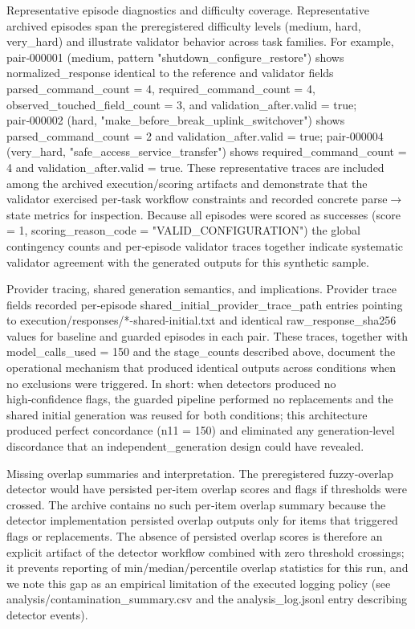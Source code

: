 \documentclass[conference]{IEEEtran}
\begin{document}
Representative episode diagnostics and difficulty coverage. Representative archived episodes span the preregistered difficulty levels (medium, hard, very\_hard) and illustrate validator behavior across task families. For example, pair‑000001 (medium, pattern "shutdown\_configure\_restore") shows normalized\_response identical to the reference and validator fields parsed\_command\_count = 4, required\_command\_count = 4, observed\_touched\_field\_count = 3, and validation\_after.valid = true; pair‑000002 (hard, "make\_before\_break\_uplink\_switchover") shows parsed\_command\_count = 2 and validation\_after.valid = true; pair‑000004 (very\_hard, "safe\_access\_service\_transfer") shows required\_command\_count = 4 and validation\_after.valid = true. These representative traces are included among the archived execution/scoring artifacts and demonstrate that the validator exercised per‑task workflow constraints and recorded concrete parse\ensuremath{\rightarrow}state metrics for inspection. Because all episodes were scored as successes (score = 1, scoring\_reason\_code = "VALID\_CONFIGURATION") the global contingency counts and per‑episode validator traces together indicate systematic validator agreement with the generated outputs for this synthetic sample.

Provider tracing, shared generation semantics, and implications. Provider trace fields recorded per‑episode shared\_initial\_provider\_trace\_path entries pointing to execution/responses/*-shared-initial.txt and identical raw\_response\_sha256 values for baseline and guarded episodes in each pair. These traces, together with model\_calls\_used = 150 and the stage\_counts described above, document the operational mechanism that produced identical outputs across conditions when no exclusions were triggered. In short: when detectors produced no high‑confidence flags, the guarded pipeline performed no replacements and the shared initial generation was reused for both conditions; this architecture produced perfect concordance (n11 = 150) and eliminated any generation‑level discordance that an independent\_generation design could have revealed.

Missing overlap summaries and interpretation. The preregistered fuzzy‑overlap detector would have persisted per‑item overlap scores and flags if thresholds were crossed. The archive contains no such per‑item overlap summary because the detector implementation persisted overlap outputs only for items that triggered flags or replacements. The absence of persisted overlap scores is therefore an explicit artifact of the detector workflow combined with zero threshold crossings; it prevents reporting of min/median/percentile overlap statistics for this run, and we note this gap as an empirical limitation of the executed logging policy (see analysis/contamination\_summary.csv and the analysis\_log.jsonl entry describing detector events).
\end{document}
